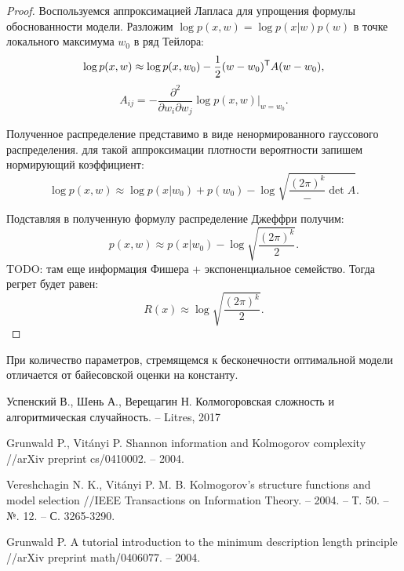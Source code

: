 \documentclass[../main.tex]{subfiles}
\begin{document}
\begin{proof}
Воспользуемся аппроксимацией Лапласа для упрощения формулы обоснованности модели.
Разложим $\log p(x, w) = \log p(x|w)p(w)$ в точке локального максимума $w_0$ в ряд Тейлора:
\[
    \log p(x,w) \approx \log p(x,w_0)  - \frac{1}{2} (w-w_0)^{\mathsf{T}} A (w-w_0),
\]
\[
    A_{ij} = -\frac{\partial^2}{\partial w_i \partial w_j}\log p(x,w)|_{w = w_0}.
\]

Полученное распределение представимо в виде ненормированного гауссового распределения. для такой аппроксимации плотности вероятности запишем нормирующий коэффициент: 
\[
    \log p(x,w) \approx \log p(x|w_0) + p(w_0) - \log \sqrt{\frac{(2\pi)^k} - {\det A}}.
\]

Подставляя в полученную формулу распределение Джеффри получим:
\[
    p(x,w) \approx p(x| w_0) - \log\sqrt{\frac{(2\pi)^k}{2}}.
\]
TODO: там еще информация Фишера + экспоненциальное семейство.
Тогда регрет будет равен:
\[
    R(x)  \approx  \log\sqrt{\frac{(2\pi)^k}{2}}.
\]
\end{proof}

\begin{theorembd}
При количество параметров, стремящемся к бесконечности  оптимальной модели отличается от байесовской оценки на константу.
\end{theorembd}
\begin{thebibliography}{99}
	Успенский В., Шень А., Верещагин Н. Колмогоровская сложность и алгоритмическая случайность. – Litres, 2017

Grunwald P., Vitányi P. Shannon information and Kolmogorov complexity //arXiv preprint cs/0410002. – 2004.

Vereshchagin N. K., Vitányi P. M. B. Kolmogorov's structure functions and model selection //IEEE Transactions on Information Theory. – 2004. – Т. 50. – №. 12. – С. 3265-3290.

Grunwald P. A tutorial introduction to the minimum description length principle //arXiv preprint math/0406077. – 2004.

\end{thebibliography}
\end{document}
